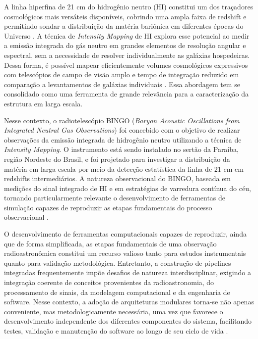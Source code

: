 A linha hiperfina de 21 cm do hidrogênio neutro (HI) constitui um dos traçadores cosmológicos mais versáteis disponíveis, cobrindo uma ampla faixa de redshift e permitindo sondar a distribuição da matéria bariônica em diferentes épocas do Universo \cite{harper2018potential}. A técnica de \textit{Intensity Mapping} de HI explora esse potencial ao medir a emissão integrada do gás neutro em grandes elementos de resolução angular e espectral, sem a necessidade de resolver individualmente as galáxias hospedeiras. Dessa forma, é possível mapear eficientemente volumes cosmológicos expressivos com telescópios de campo de visão amplo e tempo de integração reduzido em comparação a levantamentos de galáxias individuais \cite{battye2012bingo}. Essa abordagem tem se consolidado como uma ferramenta de grande relevância para a caracterização da estrutura em larga escala.

Nesse contexto, o radiotelescópio BINGO (\textit{Baryon Acoustic Oscillations from Integrated Neutral Gas Observations}) foi concebido com o objetivo de realizar observações da emissão integrada de hidrogênio neutro utilizando a técnica de \textit{Intensity Mapping}. O instrumento está sendo instalado no sertão da Paraíba, região Nordeste do Brasil, e foi projetado para investigar a distribuição da matéria em larga escala por meio da detecção estatística da linha de 21 cm em redshifts intermediários. A natureza observacional do BINGO, baseada em medições do sinal integrado de HI e em estratégias de varredura contínua do céu, tornando particularmente relevante o desenvolvimento de ferramentas de simulação capazes de reproduzir as etapas fundamentais do processo observacional \cite{ramalho2023impactos}.

O desenvolvimento de ferramentas computacionais capazes de reproduzir, ainda que de forma simplificada, as etapas fundamentais de uma observação radioastronômica constitui um recurso valioso tanto para estudos instrumentais quanto para validação metodológica. Entretanto, a construção de pipelines integradas frequentemente impõe desafios de natureza interdisciplinar, exigindo a integração coerente de conceitos provenientes da radioastronomia, do processamento de sinais, da modelagem computacional e da engenharia de software. Nesse contexto, a adoção de arquiteturas modulares torna-se não apenas conveniente, mas metodologicamente necessária, uma vez que favorece o desenvolvimento independente dos diferentes componentes do sistema, facilitando testes, validação e manutenção do software ao longo de seu ciclo de vida \cite{evans2003ddd,martin2008cleancode}.

